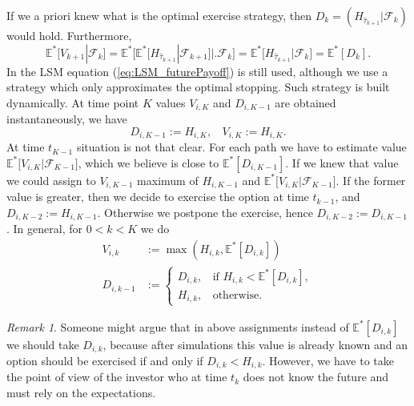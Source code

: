 \documentclass[a4paper,11pt, twoside]{book}
\theoremstyle{definition}
\theoremstyle{remark}
\newtheorem{remark}{Remark}[chapter]
\def\Em{{\mathbb{E}^*}}
\def\bpipe{{\bigl|\bigr.}}
\begin{document}
If we a priori knew what is the optimal exercise strategy, then $D_{k} = (H_{\hat{\tau}_{k+1}} | \mathcal{F}_{k})$ would hold. Furthermore,
\begin{equation}
 \label{eq:LSM_futurePayoff}
 \Em\bigl[ V_{k+1} | \mathcal{F}_{k} \bigr] = \Em\bigl[ \Em[H_{\hat{\tau}_{k+1}} | \mathcal{F}_{k+1}] \bpipe \mathcal{F}_{k} \bigr] = \Em\bigl[ H_{\hat{\tau}_{k+1}} | \mathcal{F}_k \bigr] = \Em[ D_{k} ]. 
\end{equation}
In the LSM equation (\ref{eq:LSM_futurePayoff}) is still used, although we use a strategy which only approximates the optimal stopping. Such strategy is built dynamically. At time point $K$ values $V_{i,K}$ and $D_{i,K-1}$ are obtained instantaneously, we have
\[ D_{i,K-1} := H_{i,K},\ \ \ \ V_{i,K} := H_{i,K}.\]
At time $t_{K-1}$ situation is not that clear. For each path we have to estimate value $\Em\bigl[ V_{i,K} | \mathcal{F}_{K-1} \bigr]$, which we believe is close to $\Em[D_{i,K-1}]$. If we knew that value we could assign to $V_{i,K-1}$ maximum of $H_{i,K-1}$ and $\Em\bigl[ V_{i,K} | \mathcal{F}_{K-1} \bigr]$. If the former value is greater, then we decide to exercise the option at time $t_{k-1}$, and $D_{i,K-2} := H_{i,K-1}$. Otherwise we postpone the exercise, hence $D_{i,K-2} := D_{i,K-1}$. In general, for $0 < k < K$ we do
\begin{align*}
 V_{i,k} &:= \max(H_{i,k}, \Em[D_{i,k}]) \\
 D_{i,k-1} &:= \begin{cases}
                 D_{i,k},\ \ \ \ \text{if } H_{i,k} < \Em[D_{i,k}], \\
                 H_{i,k},\ \ \ \ \text{otherwise.}
               \end{cases}
\end{align*}
\begin{remark}
 Someone might argue that in above assignments instead of $\Em[D_{i,k}]$ we should take $D_{i,k}$, because after simulations this value is already known and an option should be exercised if and only if $D_{i,k} < H_{i,k}$. However, we have to take the point of view of the investor who at time $t_k$ does not know the future and must rely on the expectations. 
\end{remark}
\end{document}
